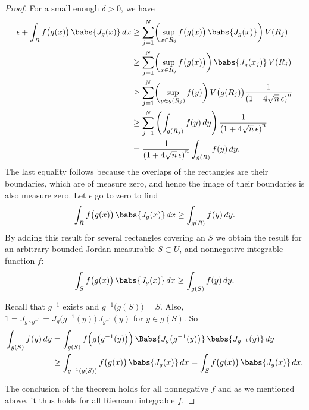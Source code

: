 \begin{proof}
For a small enough
$\delta > 0$, we have
\begin{equation*}
\begin{split}
\epsilon + \int_R f\bigl(g(x)\bigr) \, \babs{J_g(x)} \, dx
& \geq
\sum_{j=1}^N \biggl(\sup_{x \in R_j} f\bigl(g(x)\bigr) \, \babs{J_g(x)} \biggr) \, V(R_j)
\\
& \geq
\sum_{j=1}^N \biggl(\sup_{x \in R_j} f\bigl(g(x)\bigr) \biggr) \, \babs{J_g(x_j)} \, V(R_j)
\\
& \geq
\sum_{j=1}^N \biggl(\sup_{y \in g(R_j)} f(y) \biggr) \,
V\bigl(g(R_j)\bigr)
\frac{1}{{(1+4\sqrt{n} \, \epsilon)}^n}
\\
& \geq
\sum_{j=1}^N \left(\int_{g(R_j)}f(y) \,dy \right)
\frac{1}{{(1+4\sqrt{n} \, \epsilon)}^n}
\\
& =
\frac{1}{{(1+4\sqrt{n} \, \epsilon)}^n}
\int_{g(R)} f(y) \,dy .
\end{split}
\end{equation*}
The last equality follows because the overlaps of the rectangles
are their boundaries, which are of measure zero, and hence the image
of their boundaries is also measure zero.
Let $\epsilon$ go to zero to find
\begin{equation*}
\int_R f\bigl(g(x)\bigr) \, \babs{J_g(x)} \, dx \geq \int_{g(R)} f(y) \,dy .
\end{equation*}
By adding this result for several rectangles covering an $S$ we obtain the
result for an arbitrary bounded Jordan measurable $S \subset U$,
and nonnegative integrable function $f$:
\begin{equation*}
\int_S f\bigl(g(x)\bigr) \, \babs{J_g(x)} \, dx \geq \int_{g(S)} f(y) \,dy .
\end{equation*}

Recall that $g^{-1}$ exists and $g^{-1}\bigl(g(S)\bigr) = S$.
Also, $1 = J_{g\circ g^{-1}} = J_g\bigl(g^{-1}(y)\bigr) \,J_{g^{-1}}(y)$ for $y \in g(S)$.
So
\begin{equation*}
\begin{split}
\int_{g(S)} f(y) \, dy
& =
\int_{g(S)} f\Bigl(g\bigl(g^{-1}(y)\bigr)\Bigr) \,
\Babs{J_g\bigl(g^{-1}(y)\bigr)} \, \babs{J_{g^{-1}}(y)} \, dy
\\
& \geq
\int_{g^{-1}(g(S))} f\bigl(g(x)\bigr) \, \babs{J_g(x)} \, dx
=
\int_{S} f\bigl(g(x)\bigr) \, \babs{J_g(x)} \, dx .
\end{split}
\end{equation*}

The conclusion of the theorem holds
for all nonnegative $f$ and as we
mentioned above, it thus holds for all Riemann integrable $f$.
\end{proof}

